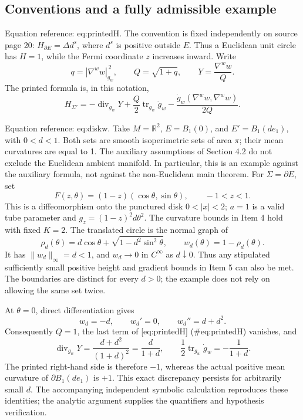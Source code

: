 \documentclass[10pt]{article}
\begin{document}
\subsection*{Conventions and a fully admissible example}
Equation reference: eq:printedH. The convention is fixed independently on source page 20: \(H_{\partial E}=\Delta d^s\), where \(d^s\) is positive outside \(E\). Thus a Euclidean unit circle has \(H=1\), while the Fermi coordinate \(z\) increases inward. Write \[q=|\nabla^w w|_{g_w}^{\,2},\qquad Q=\sqrt{1+q},\qquad
 Y=\frac{\nabla^w w}{Q}.\] The printed formula is, in this notation, \[
 H_{\Sigma'}=-\operatorname{div}_{g_w}Y+
 \frac Q2\operatorname{tr}_{g_w}\dot g_w-
 \frac{\dot g_w(\nabla^w w,\nabla^w w)}{2Q}.\]\par
Equation reference: eq:diskw. Take \(M=\mathbb R^2\), \(E=B_1(0)\), and \(E'=B_1(d e_1)\), with \(0<d<1\). Both sets are smooth isoperimetric sets of area \(\pi\); their mean curvatures are equal to 1. The auxiliary assumptions of Section 4.2 do not exclude the Euclidean ambient manifold. In particular, this is an example against the auxiliary formula, not against the non-Euclidean main theorem. For \(\Sigma=\partial E\), set \[F(z,\theta)=(1-z)(\cos\theta,\sin\theta),\qquad -1<z<1 .\] This is a diffeomorphism onto the punctured disk \(0<|x|<2\); \(a=1\) is a valid tube parameter and \(g_z=(1-z)^2d\theta^2\). The curvature bounds in Item 4 hold with fixed \(K=2\). The translated circle is the normal graph of \[
 \rho_d(\theta)=d\cos\theta+\sqrt{1-d^2\sin^2\theta},
 \qquad w_d(\theta)=1-\rho_d(\theta).\] It has \(\|w_d\|_\infty=d<1\), and \(w_d\to0\) in \(C^\infty\) as \(d\downarrow0\). Thus any stipulated sufficiently small positive height and gradient bounds in Item 5 can also be met. The boundaries are distinct for every \(d>0\); the example does not rely on allowing the same set twice.\par
At \(\theta=0\), direct differentiation gives \[w_d=-d,\qquad w_d'=0,\qquad w_d''=d+d^2 .\] Consequently \(Q=1\), the last term of [eq:printedH] (\#eq:printedH) vanishes, and \[\operatorname{div}_{g_w}Y=\frac{d+d^2}{(1+d)^2}=\frac d{1+d},
 \qquad
 \frac12\operatorname{tr}_{g_w}\dot g_w=-\frac1{1+d}.\] The printed right-hand side is therefore \(-1\), whereas the actual positive mean curvature of \(\partial B_1(d e_1)\) is \(+1\). This exact discrepancy persists for arbitrarily small \(d\). The accompanying independent symbolic calculation reproduces these identities; the analytic argument supplies the quantifiers and hypothesis verification.\par
\end{document}
